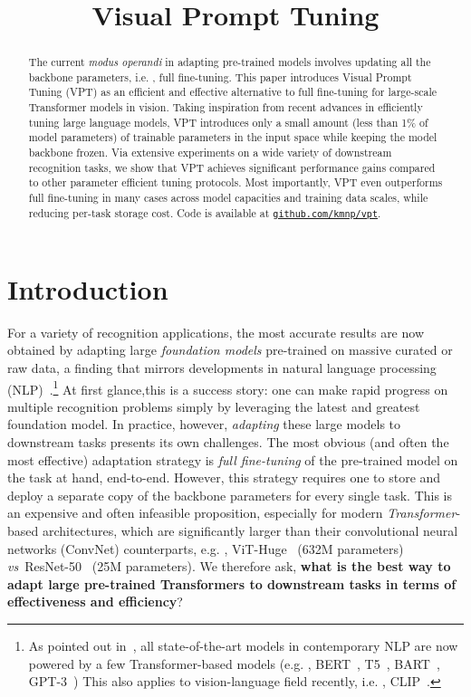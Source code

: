 \title{Visual Prompt Tuning}

\begin{abstract}
The current \textit{modus operandi} in adapting pre-trained models involves updating all the backbone parameters, i.e. , full fine-tuning. This paper introduces Visual Prompt Tuning (VPT) as an efficient and effective alternative to full fine-tuning for large-scale Transformer models in vision. Taking inspiration from recent advances in efficiently tuning large language models, VPT introduces only a small amount (less than 1\% of model parameters) of trainable parameters in the input space while keeping the model backbone frozen. Via extensive experiments on a wide variety of downstream recognition tasks, we show that VPT achieves significant performance gains compared to other parameter efficient tuning protocols. Most importantly, VPT even outperforms full fine-tuning in many cases across model capacities and training data scales, while reducing per-task storage cost. Code is available at \href{https://github.com/kmnp/vpt}{\texttt{github.com/kmnp/vpt}}.
\end{abstract}

\section{Introduction}\label{sec: intro_luming}

For a variety of recognition applications, the most accurate results are now obtained by adapting large \emph{foundation models} pre-trained on massive curated or raw data, a finding that mirrors developments in natural language processing (NLP)~\cite{bommasani2021opportunities}.\footnote{As pointed out in~\cite{bommasani2021opportunities}, all state-of-the-art models in contemporary NLP are now powered by a few Transformer-based models (e.g. , BERT~\cite{devlin-etal-2019-bert}, T5~\cite{2020t5}, BART~\cite{lewis2020bart}, GPT-3~\cite{brown2020gpt3}) This also applies to vision-language field recently, i.e. , CLIP~\cite{radford2021learning}.} At first glance,this is a success story: one can make rapid progress on multiple recognition problems simply by leveraging the latest and greatest foundation model. In practice, however, \emph{adapting} these large models to downstream tasks presents its own challenges. The most obvious (and often the most effective) adaptation strategy is \emph{full fine-tuning} of the pre-trained model on the task at hand, end-to-end. However, this strategy requires one to store and deploy a separate copy of the backbone parameters for every single task. This is an expensive and often infeasible proposition, especially for modern \emph{Transformer}-based architectures, which are significantly larger than their convolutional neural networks (ConvNet) counterparts, e.g. , ViT-Huge~\cite{dosovitskiy2020vit} (632M parameters) \emph{vs}\onedot~ResNet-50~\cite{he2016rn} (25M parameters). We therefore ask, \textbf{what is the best way to adapt large pre-trained Transformers to downstream tasks in terms of effectiveness and efficiency}?

